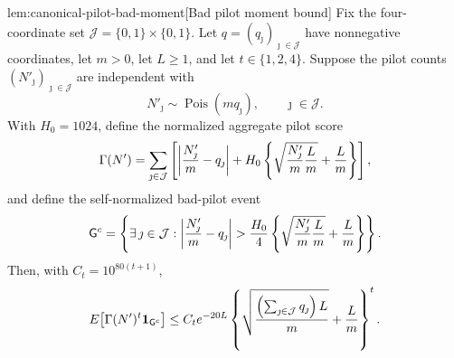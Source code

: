 \documentclass[11pt]{article}
\begin{document}
\begin{lemmav}{lem:canonical-pilot-bad-moment}[Bad pilot moment bound]
Fix the four-coordinate set \(\mathcal J=\{0,1\}\times\{0,1\}\). Let \(q=(q_\jmath)_{\jmath\in\mathcal J}\) have nonnegative coordinates, let \(m>0\), let \(L\ge 1\), and let \(t\in\{1,2,4\}\). Suppose the pilot counts \((N'_{\jmath})_{\jmath\in\mathcal J}\) are independent with
\[
N'_{\jmath}\sim \operatorname{Pois}(m q_\jmath),
\qquad \jmath\in\mathcal J .
\]
With \(H_0=1024\), define the normalized aggregate pilot score
\[
\Gamma(N')
=
\sum_{\jmath\in\mathcal J}
\left[
\left|{N'_{\jmath}\over m}-q_\jmath\right|
+
H_0\left\{\sqrt{{N'_{\jmath}\over m}{L\over m}}+{L\over m}\right\}
\right],
\]
and define the self-normalized bad-pilot event
\[
\mathsf G^c
=
\left\{
\exists\,\jmath\in\mathcal J:
\left|{N'_{\jmath}\over m}-q_\jmath\right|
>
{H_0\over 4}
\left\{\sqrt{{N'_{\jmath}\over m}{L\over m}}+{L\over m}\right\}
\right\}.
\]
Then, with \(C_t=10^{80(t+1)}\),
\[
E\!\left[\Gamma(N')^t\mathbf 1_{\mathsf G^c}\right]
\le
C_t e^{-20L}
\left\{
\sqrt{{\left(\sum_{\jmath\in\mathcal J}q_\jmath\right)L\over m}}
+
{L\over m}
\right\}^{t}.
\]
\end{lemmav}
\end{document}
